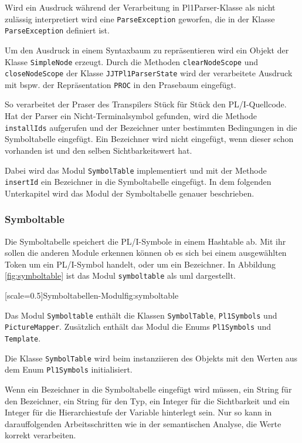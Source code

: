 Wird ein Ausdruck während der Verarbeitung in Pl1Parser-Klasse als nicht zulässig  interpretiert wird eine \verb+ParseException+ geworfen, die in der Klasse \verb+ParseException+ definiert ist.

Um den Ausdruck in einem Syntaxbaum zu repräsentieren wird ein Objekt der Klasse \verb+SimpleNode+ erzeugt. Durch die Methoden \verb+clearNodeScope+ und \verb+closeNodeScope+ der Klasse \verb+JJTPl1ParserState+ wird der verarbeitete Ausdruck mit bspw. der Repräsentation \verb+PROC+ in den Prasebaum eingefügt. 

So verarbeitet der Praser des Transpilers Stück für Stück den PL/I-Quellcode. Hat der Parser ein Nicht-Terminalsymbol gefunden, wird die Methode \verb+installIds+ aufgerufen und der Bezeichner unter bestimmten Bedingungen in die Symboltabelle eingefügt. 
Ein Bezeichner wird nicht eingefügt, 
wenn dieser schon vorhanden ist und den selben Sichtbarkeitswert hat.

Dabei wird das Modul \verb+SymbolTable+ implementiert und mit der Methode \verb+insertId+ ein Bezeichner in die Symboltabelle eingefügt. In dem folgenden Unterkapitel wird das Modul der Symboltabelle genauer beschrieben. 

\subsubsection{Symboltable}
Die Symboltabelle speichert die PL/I-Symbole in einem Hashtable ab. Mit ihr sollen die anderen Module
erkennen können ob es sich bei einem ausgewählten Token um ein PL/I-Symbol handelt, oder um ein Bezeichner.
In Abbildung \ref{fig:symboltable} ist das Modul \verb+symboltable+ als \ac{uml} dargestellt.

[scale=0.5]{Symboltabellen-Modul}{fig:symboltable}
\pagebreak

Das Modul \verb+Symboltable+ enthält die Klassen \verb+SymbolTable+, \verb+Pl1Symbols+ und \verb+PictureMapper+.
Zusätzlich enthält das Modul die Enums \verb+Pl1Symbols+ und \verb+Template+.

Die Klasse \verb+SymbolTable+ wird beim instanziieren des Objekts mit den Werten aus dem Enum \verb+Pl1Symbols+ initialisiert. 

Wenn ein Bezeichner in die Symboltabelle eingefügt wird müssen, ein String für den Bezeichner, ein String für den Typ, ein Integer für die Sichtbarkeit und ein Integer für die Hierarchiestufe der Variable hinterlegt sein. Nur so kann in darauffolgenden Arbeitsschritten wie in der semantischen Analyse, die Werte korrekt verarbeiten.

